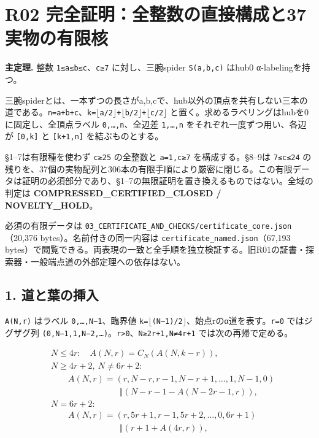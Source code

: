 \documentclass[
  10pt,
  a4paper,
]{article}
\author{}
\date{}
\let\originaltexttt\texttt
\renewcommand{\texttt}[1]{\leavevmode\allowbreak\mbox{\originaltexttt{#1}}}
\begin{document}
\section{R02
完全証明：全整数の直接構成と37実物の有限核}\label{r02-ux5b8cux5168ux8a3cux660eux5168ux6574ux6570ux306eux76f4ux63a5ux69cbux6210ux306837ux5b9fux7269ux306eux6709ux9650ux6838}

\textbf{主定理.} 整数 \texttt{1≤a≤b≤c}、\texttt{c≥7} に対し、三腕spider
\texttt{S(a,b,c)} はhub0 α-labelingを持つ。

三腕spiderとは、一本ずつの長さがa,b,cで、hub以外の頂点を共有しない三本の道である。\texttt{n=a+b+c}、\texttt{k=\ensuremath{\lfloor}a/2\ensuremath{\rfloor}+\ensuremath{\lfloor}b/2\ensuremath{\rfloor}+\ensuremath{\lfloor}c/2\ensuremath{\rfloor}}
と置く。求めるラベリングはhubを0に固定し、全頂点ラベル
\texttt{0,…,n}、全辺差 \texttt{1,…,n} をそれぞれ一度ずつ用い、各辺が
\texttt{{[}0,k{]}} と \texttt{{[}k+1,n{]}} を結ぶものとする。

§1--7は有限種を使わず \texttt{c≥25} の全整数と \texttt{a=1,c≥7}
を構成する。§8--9は \texttt{7≤c≤24}
の残りを、37個の実物配列と306本の有限手順により厳密に閉じる。この有限データは証明の必須部分であり、§1--7の無限証明を置き換えるものではない。全域の判定は
\textbf{COMPRESSED\_CERTIFIED\_CLOSED / NOVELTY\_HOLD}。

必須の有限データは
\texttt{03\_CERTIFICATE\_AND\_CHECKS/certificate\_core.json}（20,376
bytes）。名前付きの同一内容は \texttt{certificate\_named.json}（67,193
bytes）で閲覧できる。両表現の一致と全手順を独立検証する。旧R01の証書・探索器・一般端点道の外部定理への依存はない。

\subsection{1. 道と葉の挿入}\label{ux9053ux3068ux8449ux306eux633fux5165}

\texttt{A(N,r)} はラベル \texttt{0,…,N−1}、臨界値
\texttt{k=\ensuremath{\lfloor}(N−1)/2\ensuremath{\rfloor}}、始点rのα道を表す。\texttt{r=0} ではジグザグ列
\texttt{(0,N−1,1,N−2,…)}。\texttt{r\textgreater{}0}、\texttt{N≥2r+1,N≠4r+1}
では次の再帰で定める。

\[
\begin{aligned}
&N\le4r:\quad A(N,r)=C_N(A(N,k-r)),\\[3pt]
&N\ge4r+2,\ N\ne6r+2:\\
&\qquad A(N,r)=(r,N-r,r-1,N-r+1,\ldots,1,N-1,0)\\
&\hspace{8em}\Vert(N-r-1-A(N-2r-1,r)),\\[3pt]
&N=6r+2:\\
&\qquad A(N,r)=(r,5r+1,r-1,5r+2,\ldots,0,6r+1)\\
&\hspace{8em}\Vert(r+1+A(4r,r)),
\end{aligned}
\]
\end{document}
